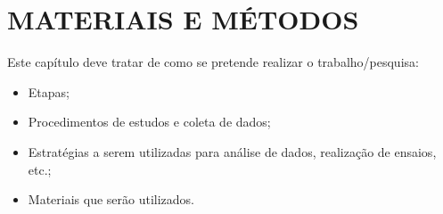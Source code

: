 
\chapter{MATERIAIS E MÉTODOS}
\label{chap:materiaisemetodos}

Este capítulo deve tratar de como se pretende realizar o trabalho/pesquisa:

\begin{itemize}
    \item Etapas;
    \item Procedimentos de estudos e coleta de dados;   
    \item Estratégias a serem utilizadas para análise de dados, realização de ensaios, etc.;
		\item Materiais que serão utilizados.
\end{itemize}